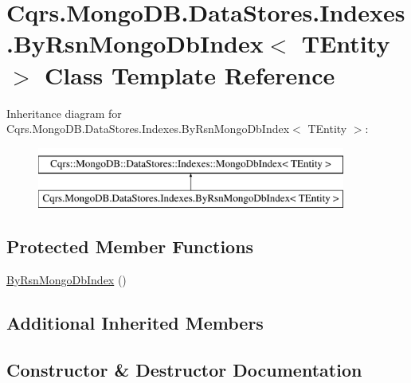 \hypertarget{classCqrs_1_1MongoDB_1_1DataStores_1_1Indexes_1_1ByRsnMongoDbIndex}{}\section{Cqrs.\+Mongo\+D\+B.\+Data\+Stores.\+Indexes.\+By\+Rsn\+Mongo\+Db\+Index$<$ T\+Entity $>$ Class Template Reference}
\label{classCqrs_1_1MongoDB_1_1DataStores_1_1Indexes_1_1ByRsnMongoDbIndex}
Inheritance diagram for Cqrs.\+Mongo\+D\+B.\+Data\+Stores.\+Indexes.\+By\+Rsn\+Mongo\+Db\+Index$<$ T\+Entity $>$\+:\begin{figure}[H]
\begin{center}
\leavevmode
\includegraphics[height=2.000000cm]{classCqrs_1_1MongoDB_1_1DataStores_1_1Indexes_1_1ByRsnMongoDbIndex}
\end{center}
\end{figure}
\subsection*{Protected Member Functions}
\begin{DoxyCompactItemize}
\item 
\hyperlink{classCqrs_1_1MongoDB_1_1DataStores_1_1Indexes_1_1ByRsnMongoDbIndex_acf6c8317e8ff8d9c3ffa592683e30665}{By\+Rsn\+Mongo\+Db\+Index} ()
\end{DoxyCompactItemize}
\subsection*{Additional Inherited Members}


\subsection{Constructor \& Destructor Documentation}
\mbox{\label{classCqrs_1_1MongoDB_1_1DataStores_1_1Indexes_1_1ByRsnMongoDbIndex_acf6c8317e8ff8d9c3ffa592683e30665}} 
